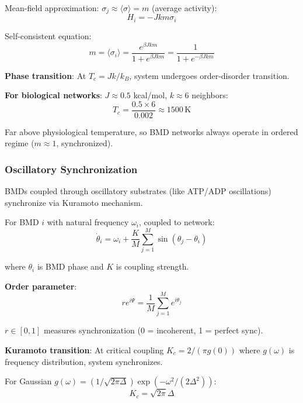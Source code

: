 \documentclass[11pt,onecolumn]{article}
\begin{document}
Mean-field approximation: $\sigma_j \approx \langle \sigma \rangle = m$ (average activity):
\begin{equation}
H_i = -J k m \sigma_i
\end{equation}

Self-consistent equation:
\begin{equation}
m = \langle \sigma_i \rangle = \frac{e^{\beta J k m}}{1 + e^{\beta J k m}} = \frac{1}{1 + e^{-\beta J k m}}
\end{equation}

\textbf{Phase transition}: At $T_c = Jk/k_B$, system undergoes order-disorder transition.

\textbf{For biological networks}: $J \approx 0.5$ kcal/mol, $k \approx 6$ neighbors:
\begin{equation}
T_c = \frac{0.5 \times 6}{0.002} \approx 1500\,\text{K}
\end{equation}

Far above physiological temperature, so BMD networks always operate in ordered regime ($m \approx 1$, synchronized).

\subsubsection{Oscillatory Synchronization}

BMDs coupled through oscillatory substrates (like ATP/ADP oscillations) synchronize via Kuramoto mechanism.

For BMD $i$ with natural frequency $\omega_i$, coupled to network:
\begin{equation}
\dot{\theta}_i = \omega_i + \frac{K}{M}\sum_{j=1}^{M} \sin(\theta_j - \theta_i)
\end{equation}

where $\theta_i$ is BMD phase and $K$ is coupling strength.

\textbf{Order parameter}:
\begin{equation}
r e^{i\Psi} = \frac{1}{M}\sum_{j=1}^{M} e^{i\theta_j}
\end{equation}

$r \in [0,1]$ measures synchronization (0 = incoherent, 1 = perfect sync).

\textbf{Kuramoto transition}: At critical coupling $K_c = 2/(\pi g(0))$ where $g(\omega)$ is frequency distribution, system synchronizes.

For Gaussian $g(\omega) = (1/\sqrt{2\pi\Delta})\exp(-\omega^2/(2\Delta^2))$:
\begin{equation}
K_c = \sqrt{2\pi} \Delta
\end{equation}
\end{document}
